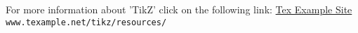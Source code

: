 \documentclass[11pt,twoside,a4paper]{book}
\begin{document}
 
    For more information about 'TikZ' click on the following link: 
    \href{http://www.texample.net/tikz/resources/}{Tex Example Site}
    \nolinkurl{www.texample.net/tikz/resources/}
\end{document}

